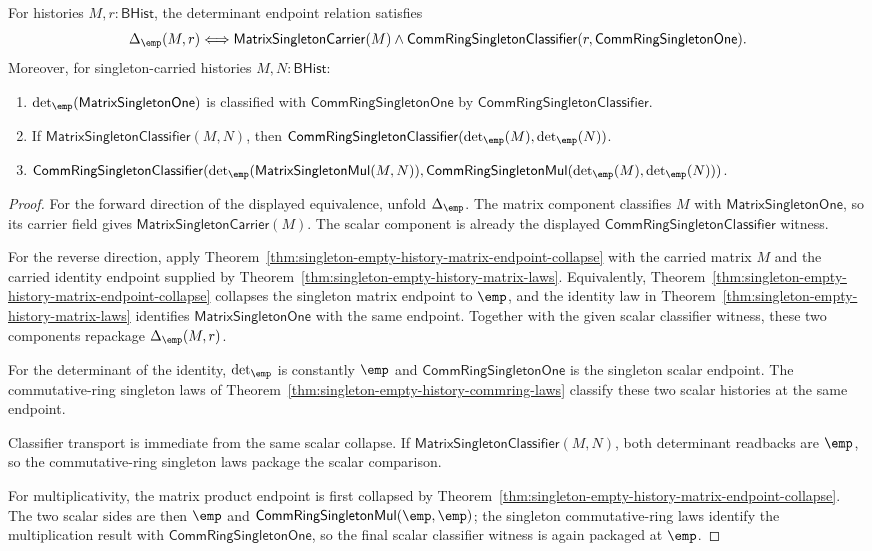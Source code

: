 \begin{theorem}
\label{thm:singleton-matrix-determinant-endpoint-correspondence}
For histories $M,r:\mathsf{BHist}$, the determinant endpoint relation satisfies
$$
\Delta_{\emp}(M,r)
\Longleftrightarrow
\mathsf{MatrixSingletonCarrier}(M)
\land
\mathsf{CommRingSingletonClassifier}(r,\mathsf{CommRingSingletonOne}).
$$
Moreover, for singleton-carried histories $M,N:\mathsf{BHist}$:
\begin{enumerate}
  \item $\det_{\emp}(\mathsf{MatrixSingletonOne})$ is classified with
  $\mathsf{CommRingSingletonOne}$ by
  $\mathsf{CommRingSingletonClassifier}$.
  \item If $\mathsf{MatrixSingletonClassifier}(M,N)$, then
  $\mathsf{CommRingSingletonClassifier}(\det_{\emp}(M),\det_{\emp}(N))$.
  \item $\mathsf{CommRingSingletonClassifier}
  (\det_{\emp}(\mathsf{MatrixSingletonMul}(M,N)),
  \mathsf{CommRingSingletonMul}(\det_{\emp}(M),\det_{\emp}(N)))$.
\end{enumerate}
\end{theorem}
\begin{proof}
For the forward direction of the displayed equivalence, unfold
$\Delta_{\emp}$. The matrix component classifies $M$ with
$\mathsf{MatrixSingletonOne}$, so its carrier field gives
$\mathsf{MatrixSingletonCarrier}(M)$. The scalar component is already the
displayed $\mathsf{CommRingSingletonClassifier}$ witness.

For the reverse direction, apply
Theorem~\ref{thm:singleton-empty-history-matrix-endpoint-collapse} with the
carried matrix $M$ and the carried identity endpoint supplied by
Theorem~\ref{thm:singleton-empty-history-matrix-laws}. Equivalently,
Theorem~\ref{thm:singleton-empty-history-matrix-endpoint-collapse} collapses
the singleton matrix endpoint to $\emp$, and the identity law in
Theorem~\ref{thm:singleton-empty-history-matrix-laws} identifies
$\mathsf{MatrixSingletonOne}$ with the same endpoint. Together with the given
scalar classifier witness, these two components repackage
$\Delta_{\emp}(M,r)$.

For the determinant of the identity, $\det_{\emp}$ is constantly $\emp$ and
$\mathsf{CommRingSingletonOne}$ is the singleton scalar endpoint. The
commutative-ring singleton laws of
Theorem~\ref{thm:singleton-empty-history-commring-laws} classify these two
scalar histories at the same endpoint.

Classifier transport is immediate from the same scalar collapse. If
$\mathsf{MatrixSingletonClassifier}(M,N)$, both determinant readbacks are
$\emp$, so the commutative-ring singleton laws package the scalar comparison.

For multiplicativity, the matrix product endpoint is first collapsed by
Theorem~\ref{thm:singleton-empty-history-matrix-endpoint-collapse}. The two
scalar sides are then $\emp$ and
$\mathsf{CommRingSingletonMul}(\emp,\emp)$; the singleton commutative-ring
laws identify the multiplication result with
$\mathsf{CommRingSingletonOne}$, so the final scalar classifier witness is
again packaged at $\emp$.
\end{proof}
